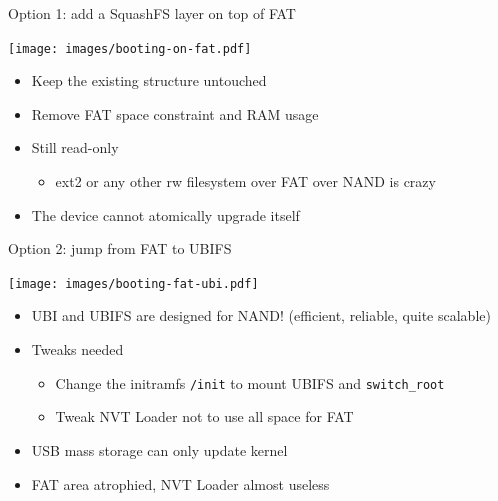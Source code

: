 \documentclass[xetex,table]{beamer}
\begin{document}
\begin{frame}{Option 1: add a SquashFS layer on top of FAT}
  \begin{center}
    \texttt{[image: images/booting-on-fat.pdf]}
  \end{center}
  \begin{itemize}
  \item Keep the existing structure untouched
  \item Remove FAT space constraint and RAM usage
  \item Still read-only
    \begin{itemize}
    \item ext2 or any other rw filesystem over FAT over NAND is crazy
    \end{itemize}
  \item The device cannot atomically upgrade itself
  \end{itemize}
\end{frame}

\begin{frame}{Option 2: jump from FAT to UBIFS}
  \begin{center}
    \texttt{[image: images/booting-fat-ubi.pdf]}
  \end{center}
  \begin{itemize}
  \item UBI and UBIFS are designed for NAND! (efficient, reliable, quite scalable)
  \item Tweaks needed
    \begin{itemize}
    \item Change the initramfs \texttt{/init} to mount UBIFS and \texttt{switch\_root}
    \item Tweak NVT Loader not to use all space for FAT
    \end{itemize}
  \item USB mass storage can only update kernel
  \item FAT area atrophied, NVT Loader almost useless
  \end{itemize}
\end{frame}
\end{document}

